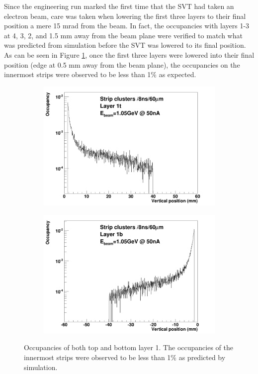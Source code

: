 Since the engineering run marked the first time that the SVT had taken an 
electron beam, care was taken when lowering the first three layers to their 
final position a mere 15 mrad from the beam.  In fact, the occupancies 
with layers 1-3 at 4, 3, 2, and 1.5 mm away from the beam plane were verified to
match what was predicted from simulation before the SVT was lowered to its final
position.  As can be seen in Figure \ref{fig:occupancies}, once the first
three layers were lowered into their final position (edge at 0.5 mm away from the
beam plane), the occupancies on the innermost strips were observed to be less
than 1\% as expected.
\begin{figure}[h!b]
    \begin{subfigure}{.5\textwidth}
        \centering
        \includegraphics[width=\textwidth]{images/cluster_occupancy_L1t_axial.png}
    \end{subfigure}
    \begin{subfigure}{.5\textwidth}
        \centering
        \includegraphics[width=\textwidth]{images/cluster_occupancy_L1b_axial.png}
    \end{subfigure}
    \caption{Occupancies of both top and bottom layer 1.  The occupancies of 
             the innermost strips were observed to be less than 1\% as predicted
             by simulation.}
    \label{fig:occupancies}
\end{figure}  

